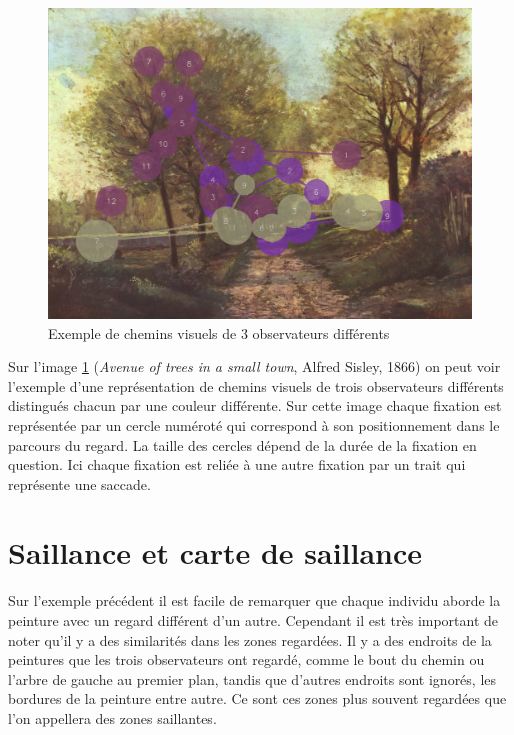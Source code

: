 \begin{figure}[!ht]
    \centering
    \includegraphics[width=0.7\linewidth]{datas/exemple_scanpaths2.png}
    \caption{Exemple de chemins visuels de 3 observateurs différents}
    \label{ex_scanpath}
\end{figure}

\par
Sur l'image \ref{ex_scanpath} (\emph{Avenue of trees in a small town}, Alfred Sisley, 1866) on peut voir l'exemple d'une représentation de chemins visuels de trois observateurs différents distingués chacun par une couleur différente. Sur cette image chaque fixation est représentée par un cercle numéroté qui correspond à son positionnement dans le parcours du regard. La taille des cercles dépend de la durée de la fixation en question. Ici chaque fixation est reliée à une autre fixation par un trait qui représente une saccade.

\section{Saillance et carte de saillance}
\par
Sur l'exemple précédent il est facile de remarquer que chaque individu aborde la peinture avec un regard différent d'un autre. Cependant il est très important de noter qu'il y a des similarités dans les zones regardées. Il y a des endroits de la peintures que les trois observateurs ont regardé, comme le bout du chemin ou l'arbre de gauche au premier plan, tandis que d'autres endroits sont ignorés, les bordures de la peinture entre autre. Ce sont ces zones plus souvent regardées que l'on appellera des zones saillantes.

